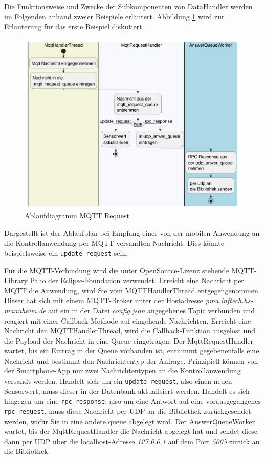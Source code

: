 \documentclass[11pt,a4paper]{report}
\begin{document}
Die Funktionsweise und Zwecke der Subkomponenten von DataHandler werden im Folgenden anhand zweier Beispiele erläutert.
Abbildung \ref{fig:serverMqttReqPath} wird zur Erläuterung für das erste Beispiel diskutiert.
\begin{figure}[htbp]
  \centering
  \includegraphics[width=\textwidth]{images/MqttRequestServerPath}
  \caption{Ablaufdiagramm MQTT Request}
  \label{fig:serverMqttReqPath}
\end{figure}
Dargestellt ist der Ablaufplan bei Empfang einer von der mobilen Anwendung an die Kontrollanwendung per MQTT versandten Nachricht.
Dies könnte beispielsweise ein \texttt{update\_request} sein.

Für die MQTT-Verbindung wird die unter OpenSource-Lizenz stehende MQTT-Library Paho \cite{paho} der Eclipse-Foundation verwendet. 
Erreicht eine Nachricht per MQTT die Anwendung, wird Sie vom MQTTHandlerThread entgegengenommen.
Dieser hat sich mit einem MQTT-Broker unter der Hostadresse \textit{pma.inftech.hs-mannheim.de} auf ein in der Datei \textit{config.json} angegebenes Topic verbunden und reagiert mit einer Callback-Methode auf eingehende Nachrichten.
Erreicht eine Nachricht den MQTTHandlerThread, wird die Callback-Funktion ausgelöst und die Payload der Nachricht in eine Queue eingetragen.
Der MqttRequestHandler wartet, bis ein Eintrag in der Queue vorhanden ist, entnimmt gegebenenfalls eine Nachricht und bestimmt den Nachrichtentyp der Anfrage.
Prinzipiell können von der Smartphone-App nur zwei Nachrichtentypen an die Kontrollanwendung versandt werden.
Handelt sich um ein \texttt{update\_request}, also einen neuen Sensorwert, muss dieser in der Datenbank aktualisiert werden.
Handelt es sich hingegen um eine \texttt{rpc\_response}, also um eine Antwort auf eine vorausgegangenes \texttt{rpc\_request}, muss diese Nachricht per UDP an die Bibliothek zurückgesendet werden, wofür Sie in eine andere queue abgelegt wird.
Der AnswerQueueWorker wartet, bis der MqttRequestHandler die Nachricht abgelegt hat und sendet diese dann per UDP über die localhost-Adresse \textit{127.0.0.1} auf dem Port \textit{5005} zurück an die Bibliothek.
\end{document}
